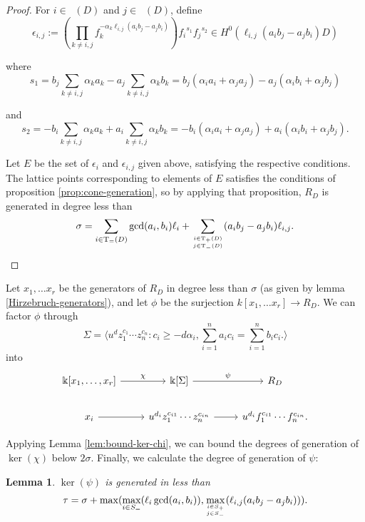 \documentclass{amsart}
\theoremstyle{plain}
\newtheorem{lem}[thm]{Lemma}
\theoremstyle{definition}
\theoremstyle{remark}
\numberwithin{equation}{section}
\newcommand\bk{{\Bbbk}}
\newcommand\bida{a}
\newcommand\bidb{b}
\DeclareMathOperator{\Te}{T_=}
\DeclareMathOperator{\Tp}{T_+}
\DeclareMathOperator{\Tm}{T_-}
\begin{document}
\begin{proof}
For $i \in \Tp(D)$ and $j \in \Tm(D)$, define
\[
	\epsilon_{i, j} := (\prod_{k \ne i,j} f_k^{-\alpha_k \ell_{i,j} (\bida_i \bidb_
j - \bida_j \bidb_i)}) {f_i}^{s_1} {f_j}^{s_2} \in H^0(\ell_{i,j}(\bida_i \bidb_j - 
\bida_j \bidb_i)D)
\]

where
\[
	s_1 = \bidb_j \sum_{k \ne i,j} \alpha_k \bida_k - \bida_j \sum_{k\ne i, j}
	\alpha_k \bidb_k = b_j (\alpha_i a_i + \alpha_j a_j) - a_j (\alpha_i b_i + \alpha_j b_j)
\]

\noindent
and
\[
	s_2 = -\bidb_i \sum_{k \ne i,j} \alpha_k \bida_k + \bida_i \sum_{k \ne i, j}
	\alpha_k \bidb_k = -b_i (\alpha_i a_i + \alpha_j a_j) + a_i (\alpha_i b_i + \alpha_j b_j).
\]

Let $E$ be the set of $\epsilon_i$ and $\epsilon_{i,j}$ given 
above, satisfying the respective conditions.
The lattice points corresponding to elements of $E$ satisfies the conditions of proposition \ref{prop:cone-generation}, so by applying that proposition, $R_D$ is generated in 
degree less than
\[
	\sigma = \sum_{i\in \Te(D)} \gcd(\bida_i, \bidb_i)\ell_i + \sum_{i\in \Tp(D) \atop
	j \in \Tm(D)} (\bida_i \bidb_j- \bida_j \bidb_i)\ell_{i,j}.
\]
\end{proof}

Let $x_1, \ldots x_r$ be the generators of $R_D$ in degree less than $\sigma$ (as given by lemma \ref{Hirzebruch-generators}), and let $\phi$ be the surjection $k[x_1, \ldots x_r] \to R_D$.  We can factor $\phi$ through 
\[
	\Sigma =  \langle u^d z_1^{c_1} \cdots z_n^{c_n} : c_i \geq -d \alpha_i, \sum_{i=1}^{n} \bida_i c_i = \sum_{i=1}^{n} \bidb_i c_i. \rangle 
\]
into
\[
\begin{tikzcd}
\bk[x_1,\ldots, x_r] \ar {r}{\chi} & \bk[\Sigma] \ar {r}{\psi} & R_D \\
x_i \ar r & u^{d_i}z_1^{c_{i1}} \cdots z_n^{c_{in}} \ar r & u^{d_i}f_1^{c_{i1}} \cdots f_n^{c_{in}}.
\end{tikzcd}
\]

Applying Lemma \ref{lem:bound-ker-chi}, we can bound the degrees of generation of $\ker(\chi)$ below
$2 \sigma$.
Finally, we calculate the degree of generation of $\psi$:

\begin{lem}
$\ker(\psi)$ is generated in less than
\[
	\tau = \sigma
	+ \max( \max_{i\in S_=}(\ell_i \gcd(a_i, b_i)), \max_{i\in S_+ \atop j\in S_-}(\ell_{i,j} (\bida_i \bidb_j - \bida_j \bidb_i))).
\]
\end{lem}
\end{document}
